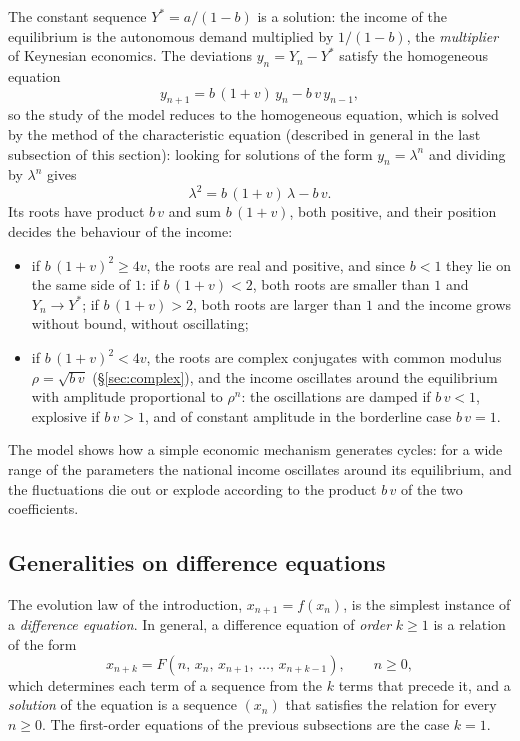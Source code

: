 \documentclass[11pt,a4paper]{article}
\theoremstyle{definition} \newtheorem{definition}{Definition} \theoremstyle{plain} \newtheorem{theorem}{Theorem}
\begin{document}
The constant sequence $Y^*=a/(1-b)$ is a solution: the income of the
equilibrium is the autonomous demand multiplied by $1/(1-b)$, the
\emph{multiplier} of Keynesian economics. The deviations
$y_n = Y_n - Y^*$ satisfy the homogeneous equation
\[ y_{n+1} = b\,(1+v)\,y_n - b\,v\,y_{n-1}, \]
so the study of the model reduces to the homogeneous equation, which is
solved by the method of the characteristic equation (described in
general in the last subsection of this section): looking for
solutions of the form $y_n=\lambda^n$ and dividing by $\lambda^n$ gives
\[ \lambda^2 = b\,(1+v)\,\lambda - b\,v. \]
Its roots have product $b\,v$ and sum $b\,(1+v)$, both positive, and
their position decides the behaviour of the income:
\begin{itemize}
\item if $b\,(1+v)^2 \ge 4v$, the roots are real and positive, and since
$b<1$ they lie on the same side of $1$: if $b\,(1+v)<2$, both roots are
smaller than $1$ and $Y_n\to Y^*$; if $b\,(1+v)>2$, both roots are
larger than $1$ and the income grows without bound, without oscillating;
\item if $b\,(1+v)^2 < 4v$, the roots are complex conjugates with common
modulus $\rho=\sqrt{b\,v}$ (\S\ref{sec:complex}), and the income oscillates around the
equilibrium with amplitude proportional to $\rho^n$: the oscillations are
damped if $b\,v<1$, explosive if $b\,v>1$, and of constant amplitude in
the borderline case $b\,v=1$.
\end{itemize}
The model shows how a simple economic mechanism generates cycles: for a
wide range of the parameters the national income oscillates around its
equilibrium, and the fluctuations die out or explode according to the
product $b\,v$ of the two coefficients.

\subsection{Generalities on difference equations}

The evolution law of the introduction, $x_{n+1}=f(x_n)$, is the simplest
instance of a \emph{difference equation}. In general, a difference
equation of \emph{order} $k\ge 1$ is a relation of the form
\[ x_{n+k} = F(n,\,x_n,\,x_{n+1},\,\ldots,\,x_{n+k-1}), \qquad n\ge 0, \]
which determines each term of a sequence from the $k$ terms that precede
it, and a \emph{solution} of the equation is a sequence $(x_n)$ that
satisfies the relation for every $n\ge 0$. The first-order equations
of the previous subsections are the case $k=1$.
\end{document}
